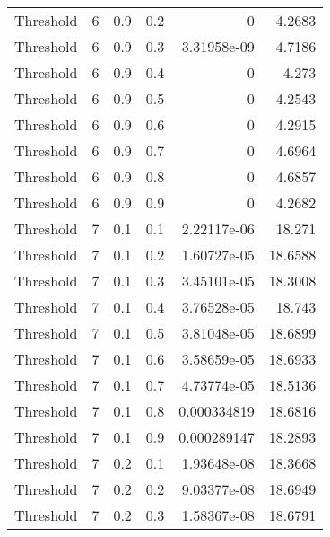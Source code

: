 \documentclass{article}
\begin{document}
\begin{longtable}[H]{lrrrrr}
 Threshold      &       6 &   0.9 &            0.2 &      0           &          4.2683 \\
 Threshold      &       6 &   0.9 &            0.3 &      3.31958e-09 &          4.7186 \\
 Threshold      &       6 &   0.9 &            0.4 &      0           &          4.273  \\
 Threshold      &       6 &   0.9 &            0.5 &      0           &          4.2543 \\
 Threshold      &       6 &   0.9 &            0.6 &      0           &          4.2915 \\
 Threshold      &       6 &   0.9 &            0.7 &      0           &          4.6964 \\
 Threshold      &       6 &   0.9 &            0.8 &      0           &          4.6857 \\
 Threshold      &       6 &   0.9 &            0.9 &      0           &          4.2682 \\
 Threshold      &       7 &   0.1 &            0.1 &      2.22117e-06 &         18.271  \\
 Threshold      &       7 &   0.1 &            0.2 &      1.60727e-05 &         18.6588 \\
 Threshold      &       7 &   0.1 &            0.3 &      3.45101e-05 &         18.3008 \\
 Threshold      &       7 &   0.1 &            0.4 &      3.76528e-05 &         18.743  \\
 Threshold      &       7 &   0.1 &            0.5 &      3.81048e-05 &         18.6899 \\
 Threshold      &       7 &   0.1 &            0.6 &      3.58659e-05 &         18.6933 \\
 Threshold      &       7 &   0.1 &            0.7 &      4.73774e-05 &         18.5136 \\
 Threshold      &       7 &   0.1 &            0.8 &      0.000334819 &         18.6816 \\
 Threshold      &       7 &   0.1 &            0.9 &      0.000289147 &         18.2893 \\
 Threshold      &       7 &   0.2 &            0.1 &      1.93648e-08 &         18.3668 \\
 Threshold      &       7 &   0.2 &            0.2 &      9.03377e-08 &         18.6949 \\
 Threshold      &       7 &   0.2 &            0.3 &      1.58367e-08 &         18.6791 \\

\end{longtable}
\end{document}
